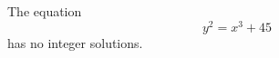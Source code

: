 \begin{proposition}\label{eq:090}
    The equation
\[
    y^2=x^3+45
\]
    has no integer solutions.
\end{proposition}
